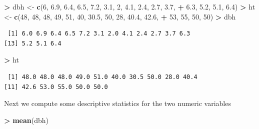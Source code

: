 \documentclass[]{krantz}
\makeatletter
\newenvironment{Shaded}{\begin{snugshade}}{\end{snugshade}}
\newcommand{\KeywordTok}[1]{\textcolor[rgb]{0.27,0.27,0.27}{\textbf{#1}}}
\newcommand{\DecValTok}[1]{\textcolor[rgb]{0.06,0.06,0.06}{#1}}
\newcommand{\FloatTok}[1]{\textcolor[rgb]{0.06,0.06,0.06}{#1}}
\newcommand{\StringTok}[1]{\textcolor[rgb]{0.5,0.5,0.5}{#1}}
\newcommand{\OperatorTok}[1]{\textcolor[rgb]{0.43,0.43,0.43}{\textbf{#1}}}
\newcommand{\NormalTok}[1]{#1}
\newenvironment{kframe}{%
\medskip{}
\setlength{\fboxsep}{.8em}
 \def\at@end@of@kframe{}%
 \ifinner\ifhmode%
  \def\at@end@of@kframe{\end{minipage}}%
  \begin{minipage}{\columnwidth}%
 \fi\fi%
 \def\FrameCommand##1{\hskip\@totalleftmargin \hskip-\fboxsep
 \colorbox{shadecolor}{##1}\hskip-\fboxsep
     \hskip-\linewidth \hskip-\@totalleftmargin \hskip\columnwidth}%
 \MakeFramed {\advance\hsize-\width
   \@totalleftmargin\z@ \linewidth\hsize
   \@setminipage}}%
 {\par\unskip\endMakeFramed%
 \at@end@of@kframe}
\renewenvironment{Shaded}{\begin{kframe}}{\end{kframe}}
\theoremstyle{definition}
\theoremstyle{definition}
\theoremstyle{definition}
\theoremstyle{remark}
\makeatother
\begin{document}
\begin{Shaded}
\begin{Highlighting}[]
\OperatorTok{>}\StringTok{ }\NormalTok{dbh <-}\StringTok{ }\KeywordTok{c}\NormalTok{(}\DecValTok{6}\NormalTok{, }\FloatTok{6.9}\NormalTok{, }\FloatTok{6.4}\NormalTok{, }\FloatTok{6.5}\NormalTok{, }\FloatTok{7.2}\NormalTok{, }\FloatTok{3.1}\NormalTok{, }\DecValTok{2}\NormalTok{, }\FloatTok{4.1}\NormalTok{, }\FloatTok{2.4}\NormalTok{, }\FloatTok{2.7}\NormalTok{, }\FloatTok{3.7}\NormalTok{, }
\OperatorTok{+}\StringTok{   }\FloatTok{6.3}\NormalTok{, }\FloatTok{5.2}\NormalTok{, }\FloatTok{5.1}\NormalTok{, }\FloatTok{6.4}\NormalTok{)}
\OperatorTok{>}\StringTok{ }\NormalTok{ht <-}\StringTok{ }\KeywordTok{c}\NormalTok{(}\DecValTok{48}\NormalTok{, }\DecValTok{48}\NormalTok{, }\DecValTok{48}\NormalTok{, }\DecValTok{49}\NormalTok{, }\DecValTok{51}\NormalTok{, }\DecValTok{40}\NormalTok{, }\FloatTok{30.5}\NormalTok{, }\DecValTok{50}\NormalTok{, }\DecValTok{28}\NormalTok{, }\FloatTok{40.4}\NormalTok{, }\FloatTok{42.6}\NormalTok{, }
\OperatorTok{+}\StringTok{   }\DecValTok{53}\NormalTok{, }\DecValTok{55}\NormalTok{, }\DecValTok{50}\NormalTok{, }\DecValTok{50}\NormalTok{)}
\OperatorTok{>}\StringTok{ }\NormalTok{dbh}
\end{Highlighting}
\end{Shaded}

\begin{verbatim}
 [1] 6.0 6.9 6.4 6.5 7.2 3.1 2.0 4.1 2.4 2.7 3.7 6.3
[13] 5.2 5.1 6.4
\end{verbatim}

\begin{Shaded}
\begin{Highlighting}[]
\OperatorTok{>}\StringTok{ }\NormalTok{ht}
\end{Highlighting}
\end{Shaded}

\begin{verbatim}
 [1] 48.0 48.0 48.0 49.0 51.0 40.0 30.5 50.0 28.0 40.4
[11] 42.6 53.0 55.0 50.0 50.0
\end{verbatim}

Next we compute some descriptive statistics for the two numeric
variables

\begin{Shaded}
\begin{Highlighting}[]
\OperatorTok{>}\StringTok{ }\KeywordTok{mean}\NormalTok{(dbh)}
\end{Highlighting}
\end{Shaded}
\end{document}
